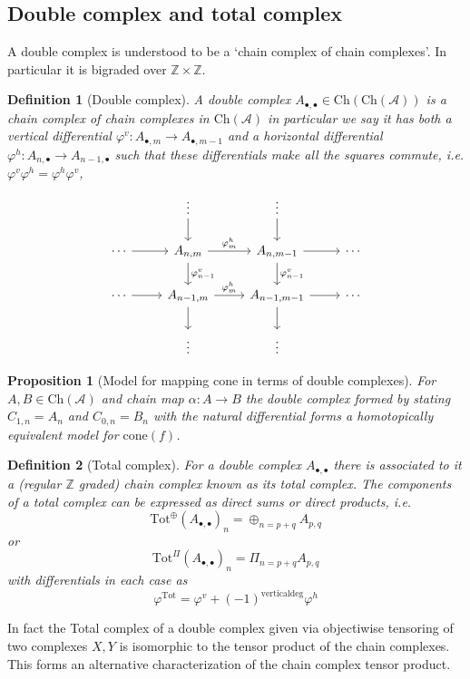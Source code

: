 \documentclass[12pt]{article}
\numberwithin{equation}{section}
\newcommand{\Z}{\mathbb{Z}}
\newtheorem{definition}{Definition}[section]
\newtheorem{proposition}{Proposition}[section]
\begin{document}
	\subsection{Double complex and total complex}
	A double complex is understood to be a `chain complex of chain complexes'. In particular it is bigraded over $\Z \times \Z$.
	\begin{definition}[Double complex]
		A double complex $A_{\bullet, \bullet}\in \mathrm{Ch}(\mathrm{Ch}(\mathcal{A}))$ is a chain complex of chain complexes in $\mathrm{Ch}(\mathcal{A})$ in particular we say it has both a vertical differential $\varphi^v: A_{\bullet, m}\to A_{\bullet, m-1} $ and a horizontal differential $\varphi^h: A_{n, \bullet} \to A_{n-1, \bullet}$  such that these differentials make all the squares commute, i.e. $\varphi^v \varphi^h=\varphi^h \varphi^v$,
		\[\begin{tikzcd}
			& \vdots & \vdots \\
			\cdots & {A_{n,m}} & {A_{n,m-1}} & \cdots \\
			\cdots & {A_{n-1,m}} & {A_{n-1,m-1}} & \cdots \\
			& \vdots & \vdots
			\arrow["{\varphi^h_{m}}", from=2-2, to=2-3]
			\arrow[from=2-3, to=2-4]
			\arrow[from=2-1, to=2-2]
			\arrow[from=1-2, to=2-2]
			\arrow[from=1-3, to=2-3]
			\arrow["{\varphi^v_{n-1}}", from=2-2, to=3-2]
			\arrow["{\varphi^v_{n-1}}", from=2-3, to=3-3]
			\arrow[from=3-2, to=4-2]
			\arrow[from=3-3, to=4-3]
			\arrow[from=3-1, to=3-2]
			\arrow["{\varphi^h_{m}}", from=3-2, to=3-3]
			\arrow[from=3-3, to=3-4]
		\end{tikzcd}\]
	\end{definition}
	\begin{proposition}[Model for mapping cone in terms of double complexes]
		For $A,B \in \mathrm{Ch}(\mathcal{A})$ and chain map $\alpha: A \to B$ the double complex formed by stating $C_{1,n}=A_n$ and $C_{0,n}=B_n$ with the natural differential forms a homotopically equivalent model for $\mathrm{cone}(f)$.
	\end{proposition}
	\begin{definition}[Total complex]
		For a double complex $A_{\bullet,\bullet}$ there is associated to it a (regular $\Z$ graded) chain complex known as its total complex. The components of a total complex can be expressed as direct sums or direct products, i.e.
		\[ \mathrm{Tot}^\oplus (A_{\bullet, \bullet})_n=\oplus_{n=p+q} A_{p,q} \]
		or
		\[ \mathrm{Tot}^\Pi (A_{\bullet, \bullet})_n=\Pi_{n=p+q} A_{p,q} \]
		with differentials in each case as 
		\[ \varphi^{\mathrm{Tot}}=\varphi^v+(-1)^{\mathrm{vertical deg}}\varphi^h \]
	\end{definition}
	In fact the Total complex of a double complex given via objectiwise tensoring of two complexes $X,Y$ is isomorphic to the tensor product of the chain complexes. This forms an alternative characterization of the chain complex tensor product.
	
\end{document}
